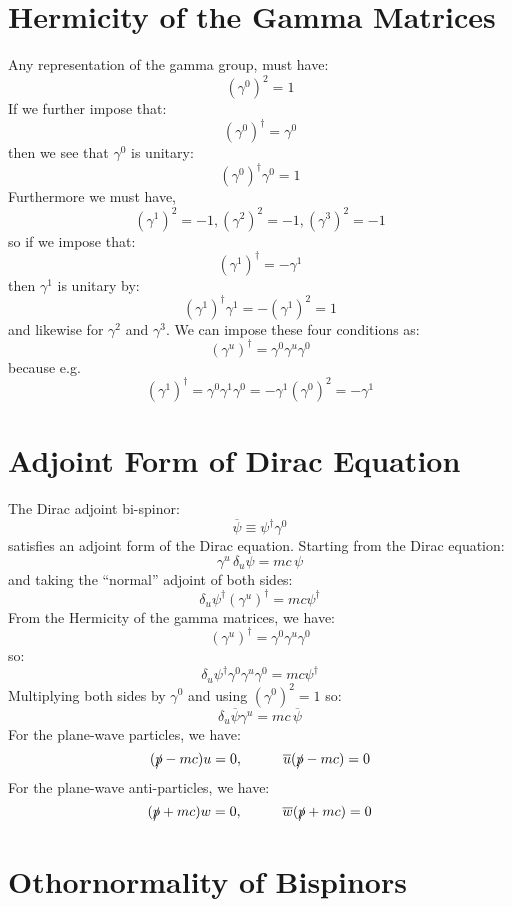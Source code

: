 \documentclass[12pt]{book}
\begin{document}
\section{Hermicity of the Gamma Matrices}

Any representation of the gamma group, must have:
$$(\gamma^0)^2=1$$
If we further impose that:
$$(\gamma^0)^\dagger = \gamma^0$$
then we see that $\gamma^0$ is unitary:
$$(\gamma^0)^\dagger \gamma^0 = 1$$
Furthermore we must have,
$$(\gamma^1)^2=-1, (\gamma^2)^2=-1, (\gamma^3)^2=-1$$
so if we impose that:
$$(\gamma^1)^\dagger = -\gamma^1$$
then $\gamma^1$ is unitary by:
$$(\gamma^1)^\dagger \gamma^1 = - (\gamma^1)^2 = 1$$
and likewise for $\gamma^2$ and $\gamma^3$.  We can impose these four conditions as:
$$(\gamma^u)^\dagger = \gamma^0 \gamma^u \gamma^0$$
because e.g. 
$$(\gamma^1)^\dagger = \gamma^0 \gamma^1 \gamma^0 = - \gamma^1 (\gamma^0)^2 = -\gamma^1$$

\section{Adjoint Form of Dirac Equation}

The Dirac adjoint bi-spinor:
$$\overline{\psi} \equiv \psi^\dagger \gamma^0$$
satisfies an adjoint form of the Dirac equation.  Starting from the Dirac equation:
$$\gamma^u \, \delta_u \psi = mc \, \psi $$
and taking the ``normal'' adjoint of both sides:
$$\delta_u \psi^\dagger (\gamma^u)^\dagger = mc \psi^\dagger  $$
From the Hermicity of the gamma matrices, we have:
$$(\gamma^u)^\dagger = \gamma^0 \gamma^u \gamma^0$$
so:
$$\delta_u \psi^\dagger \gamma^0 \gamma^u \gamma^0 = mc \psi^\dagger$$
Multiplying both sides by $\gamma^0$ and using $(\gamma^0)^2=1$ so:
$$\delta_u \overline{\psi}  \gamma^u  =  mc \, \overline{\psi}$$
For the plane-wave particles, we have:
$$(\slashed{p} - mc) u = 0, \hspace{1cm} \overline{u} (\slashed{p} - mc) = 0$$
For the plane-wave anti-particles, we have:
$$(\slashed{p} + mc) w = 0, \hspace{1cm} \overline{w} (\slashed{p} + mc) = 0$$

\section{Othornormality of Bispinors}
\end{document}
